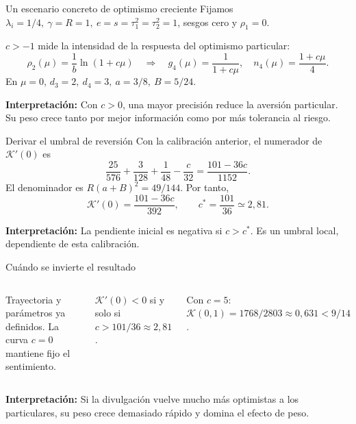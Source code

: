 \documentclass[aspectratio=169,11pt]{beamer}
\newcommand{\K}{\mathcal K}
\newcommand{\idea}[1]{\par\medskip\textbf{Interpretación:} #1}
\begin{document}
\begin{frame}{Un escenario concreto de optimismo creciente}
\small
Fijamos \(\lambda_i=1/4,\ \gamma=R=1,\ e=s=\tau_1^2=\tau_2^2=1\),
sesgos cero y \(\rho_1=0\).
\medskip\par
\(c>-1\) mide la intensidad de la respuesta del optimismo particular:
\[
\rho_2(\mu)=\frac1b\ln(1+c\mu)
\quad\Longrightarrow\quad
g_4(\mu)=\frac1{1+c\mu},\quad n_4(\mu)=\frac{1+c\mu}{4}.
\]
En \(\mu=0\), \(d_3=2,\ d_4=3,\ a=3/8,\ B=5/24\).
\normalsize
\idea{Con \(c>0\), una mayor precisión reduce la aversión particular.
Su peso crece tanto por mejor información como por más tolerancia al riesgo.}
\end{frame}

\begin{frame}{Derivar el umbral de reversión}
Con la calibración anterior, el numerador de \(\K'(0)\) es
\[
\frac{25}{576}+\frac3{128}+\frac1{48}-\frac c{32}
=\frac{101-36c}{1152}.
\]
El denominador es \(R(a+B)^2=49/144\). Por tanto,
\[
\boxed{\K'(0)=\frac{101-36c}{392}},\qquad
\boxed{c^*=\frac{101}{36}\simeq2{,}81}.
\]
\idea{La pendiente inicial es negativa si \(c>c^*\).
Es un umbral local, dependiente de esta calibración.}
\end{frame}

\begin{frame}{Cuándo se invierte el resultado}
\begin{columns}
\resizebox{\linewidth}{!}{}
\small
Trayectoria y parámetros ya definidos. La curva \(c=0\) mantiene fijo el sentimiento.
\medskip

\(\K'(0)<0\) si y solo si \(c>101/36\approx2{,}81\).
\medskip

Con \(c=5\): \(\K(0{,}1)=1768/2803\approx0{,}631<9/14\).
\end{columns}
\idea{Si la divulgación vuelve mucho más optimistas a los particulares, su
peso crece demasiado rápido y domina el efecto de peso.}
\end{frame}
\end{document}

